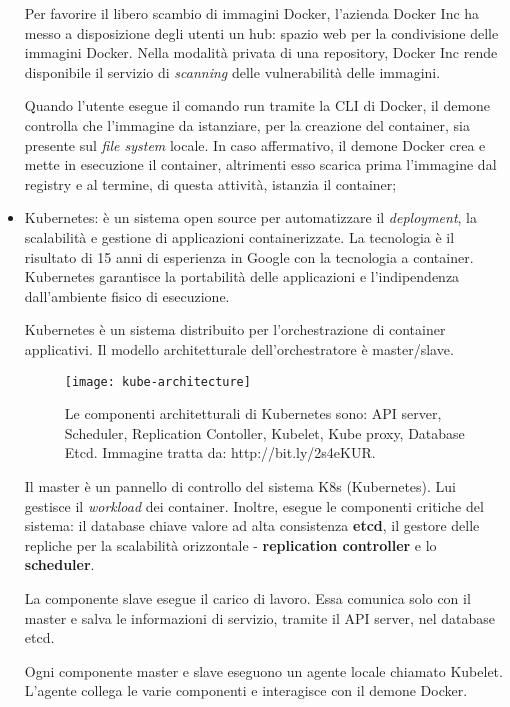 \begin{itemize}
	Per favorire il libero scambio di immagini Docker, l'azienda Docker Inc 
ha 
	messo a disposizione degli utenti un hub: spazio web per la 
condivisione delle immagini Docker. Nella modalità privata di una repository, 
Docker Inc rende disponibile 
	il servizio di \textit{scanning} delle vulnerabilità delle immagini. 
	
	Quando l'utente esegue il comando run tramite la CLI di Docker, il 
demone controlla che l'immagine da istanziare, per la creazione del container, 
sia presente sul \textit{file system} locale. In caso affermativo, il demone 
Docker crea e mette in esecuzione il container, altrimenti esso scarica prima 
l'immagine dal registry e al termine, di questa attività, istanzia il container;
	\item Kubernetes: è un sistema open source per automatizzare il 
\textit{deployment}, la scalabilità e gestione di applicazioni containerizzate. 
La tecnologia è il 
	risultato di 15 anni di esperienza in Google con la tecnologia a 
container. 
	Kubernetes garantisce la portabilità delle applicazioni e 
l'indipendenza dall'ambiente fisico di esecuzione.
	
	Kubernetes è un sistema distribuito per l'orchestrazione di container 
applicativi. Il modello architetturale dell'orchestratore è master/slave.
	
	\begin{figure}[htbp]
		\begin{center}
			\texttt{[image: kube-architecture]}
			\caption{Le componenti architetturali di Kubernetes 
sono: API server, Scheduler, Replication Contoller, Kubelet, Kube proxy, 
Database Etcd. Immagine tratta da: http://bit.ly/2s4eKUR.}
		\end{center}
	\end{figure}
	
	Il master è un pannello di controllo del sistema K8s (Kubernetes). Lui 
gestisce il \textit{workload} dei container. Inoltre, esegue le componenti 
critiche del sistema: il database chiave valore ad alta consistenza 
\textbf{etcd}, il gestore delle repliche per la scalabilità orizzontale - 
\textbf{replication controller} e lo \textbf{scheduler}.  
	
	La componente slave esegue il carico di lavoro. Essa comunica solo con 
il master e salva le informazioni di servizio, tramite il API server, nel 
database etcd. 
	
	Ogni componente master e slave eseguono un agente locale chiamato 
Kubelet. L'agente collega le varie componenti e interagisce con il demone 
Docker. 
	

\end{itemize}
